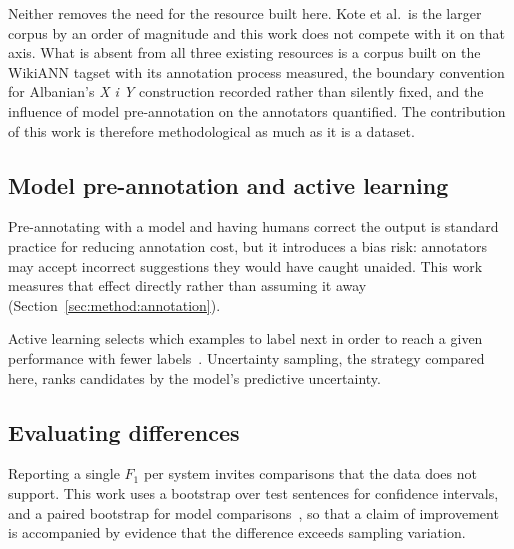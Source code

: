 Neither removes the need for the resource built here. Kote et al.\ is the larger corpus by an order of magnitude and this work does not compete with it on that axis. What is absent from all three existing resources is a corpus built on the WikiANN tagset with its annotation process measured, the boundary convention for Albanian's \emph{X i Y} construction recorded rather than silently fixed, and the influence of model pre-annotation on the annotators quantified. The contribution of this work is therefore methodological as much as it is a dataset.

\subsection{Model pre-annotation and active learning}

Pre-annotating with a model and having humans correct the output is standard practice for reducing annotation cost, but it introduces a bias risk: annotators may accept incorrect suggestions they would have caught unaided. This work measures that effect directly rather than assuming it away (Section~\ref{sec:method:annotation}).

Active learning selects which examples to label next in order to reach a given performance with fewer labels~\cite{bib:settles2009}. Uncertainty sampling, the strategy compared here, ranks candidates by the model's predictive uncertainty.

\subsection{Evaluating differences}

Reporting a single $F_1$ per system invites comparisons that the data does not support. This work uses a bootstrap over test sentences for confidence intervals, and a paired bootstrap for model comparisons~\cite{bib:koehn2004}, so that a claim of improvement is accompanied by evidence that the difference exceeds sampling variation.
